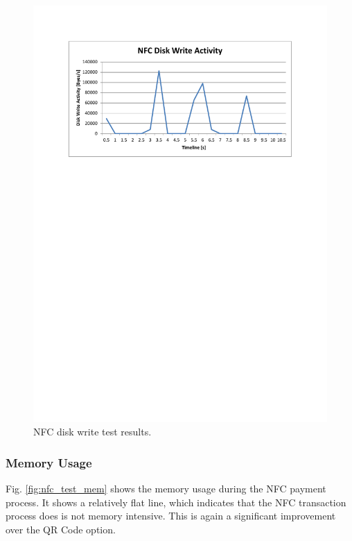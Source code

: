 \begin{figure}
 \centering 
 \includegraphics[clip=true, trim = 0 530 0 70,
 scale=0.7]{nfc_test_disk}
 \caption{NFC disk write test results.}
 \label{fig:nfc_test_disk}
\end{figure}

\subsubsection{Memory Usage}
\label{sec:nfc_mem}

Fig. \ref{fig:nfc_test_mem} shows the memory usage during the NFC payment process. It
shows a relatively flat line, which indicates that the NFC transaction process does is not
memory intensive. This is again a significant improvement over the QR Code option. 

